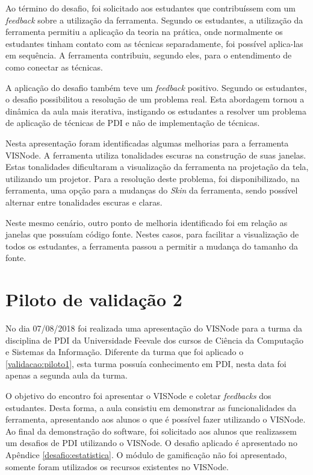 \documentclass[
	12pt,				%
	oneside,			%
	a4paper,			%
	english,			%
	french,				%
	spanish,			%
	brazil,				%
	]{abntex2}
\begin{document}
Ao término do desafio, foi solicitado aos estudantes que contribuíssem com um \textit{feedback} sobre a utilização da ferramenta. Segundo os estudantes, a utilização da ferramenta permitiu a aplicação da teoria na prática, onde normalmente os estudantes tinham contato com as técnicas separadamente, foi possível aplica-las em sequência. A ferramenta contribuiu, segundo eles, para o entendimento de como conectar as técnicas.

A aplicação do desafio também teve um \textit{feedback} positivo. Segundo os estudantes, o desafio possibilitou a resolução de um problema real. Esta abordagem tornou a dinâmica da aula mais iterativa, instigando os estudantes a resolver um problema de aplicação de técnicas de PDI e não de implementação de técnicas.

Nesta apresentação foram identificadas algumas melhorias para a ferramenta VISNode. A ferramenta utiliza tonalidades escuras na construção de suas janelas. Estas tonalidades dificultaram a visualização da ferramenta na projetação da tela, utilizando um projetor. Para a resolução deste problema, foi disponibilizado, na ferramenta, uma opção para a mudanças do \textit{Skin} da ferramenta, sendo possível alternar entre tonalidades escuras e claras.

Neste mesmo cenário, outro ponto de melhoria identificado foi em relação as janelas que possuíam código fonte. Nestes casos, para facilitar a visualização de todos os estudantes, a ferramenta  passou a permitir a mudança do tamanho da fonte.

\section{Piloto de validação 2}

No dia 07/08/2018 foi realizada uma apresentação do VISNode para a turma da disciplina de PDI da Universidade Feevale dos cursos de Ciência da Computação e Sistemas da Informação. Diferente da turma que foi aplicado o \ref{validacao:piloto1}, esta turma possuía conhecimento em PDI, nesta data foi apenas a segunda aula da turma. 

O objetivo do encontro foi apresentar o VISNode e coletar \textit{feedbacks} dos estudantes. Desta forma, a aula consistiu em demonstrar as funcionalidades da ferramenta, apresentando aos alunos o que é possível fazer utilizando o VISNode. Ao final da demonstração do software, foi solicitado aos alunos que realizassem um desafios de PDI utilizando o VISNode. O desafio aplicado é apresentado no Apêndice \ref{desafio:estatistica}. O módulo de gamificação não foi apresentado, somente foram utilizados os recursos existentes no VISNode.
\end{document}
